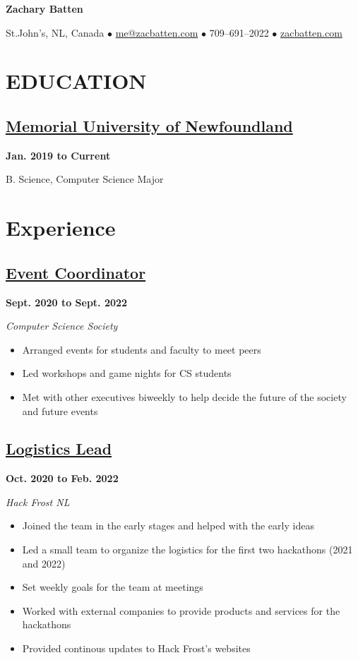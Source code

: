 \documentclass[12pt]{extarticle}
\begin{document}
\begin{center}
\textbf{\huge{Zachary Batten}}

St.John's, NL, Canada
$\bullet$ \href{mailto:me@zacbatten.com}{me@zacbatten.com}
$\bullet$ 709--691--2022
$\bullet$ \href{https://zacbatten.com}{zacbatten.com}
\end{center}

\section*{EDUCATION}
\subsection*{\href{https://www.mun.ca/}{Memorial University of Newfoundland} 
}
\hfill \textbf{Jan. 2019 to Current}

B. Science, Computer Science Major

\section*{Experience}

\subsection*{\href{https://muncompsci.ca/}{Event Coordinator} 
}
\hfill \textbf{Sept. 2020 to Sept. 2022}

\textit{Computer Science Society}
\begin{itemize}
  \item Arranged events for students and faculty to meet peers
  \item Led workshops and game nights for CS students
  \item Met with other executives biweekly to help decide the future of the society and future events
\end{itemize}

\subsection*{\href{https://hackfrostnl.ca/}{Logistics Lead}
} \hfill \textbf{Oct. 2020 to Feb. 2022}

\textsl{Hack Frost NL}
\begin{itemize}
  \item Joined the team in the early stages and helped with the early ideas
  \item Led a small team to organize the logistics for the first two hackathons (2021 and 2022)
  \item Set weekly goals for the team at meetings
  \item Worked with external companies to provide products and services for the hackathons
  \item Provided continous updates to Hack Frost's websites
\end{itemize}
\end{document}
